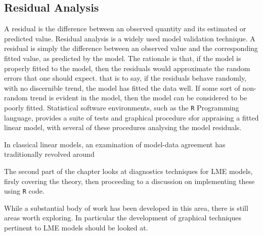 \documentclass[12pt, a4paper]{article}
\begin{document}
			\subsection{Residual Analysis}
			A residual is the difference between an observed quantity and its
			estimated or predicted value. 
			Residual analysis is a widely used model validation technique. A residual is simply the difference between an observed value and the corresponding fitted value, as predicted by the model. The rationale is that, if the model is properly fitted to the model, then the residuals would approximate the random errors that one should expect.
			that is to say, if the residuals behave randomly, with no discernible trend, the model has fitted the data well. If some sort of non-random trend is evident in the model, then the model can be considered to be poorly fitted.
			Statistical software environments, such as the \texttt{R} Programming language, provides a suite of tests and graphical procedure sfor appraising a fitted linear model, with several 
			of these procedures analysing the model residuals.
			
			In classical linear models, an examination of model-data agreement has traditionally revolved around
			
			The second part of the chapter looks at diagnostics techniques for LME models, firsly covering the theory, then proceeding to a discussion on 
			implementing these using \texttt{R} code.
			
			While a substantial body of work has been developed in this area, there is still areas worth exploring. 
			In particular the development of graphical techniques pertinent to LME models should be looked at.
			
			
			
			
			
\end{document}
